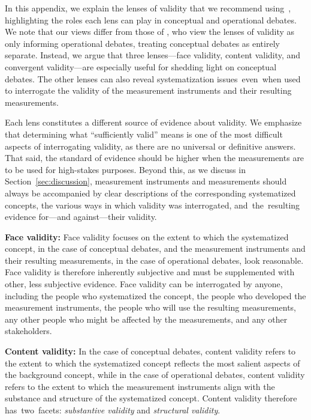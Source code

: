\documentclass{article}
\begin{document}
In this appendix, we explain the lenses of validity that we recommend using~\cite{jacobs2021measurement}, highlighting the roles each lens can play in conceptual and operational debates. We note that our views differ from those of \citet{adcock2001measurement}, who 
view the lenses of validity as only informing operational debates, treating conceptual debates as entirely separate. Instead, we argue that three lenses---face validity, content validity, and convergent validity---are especially useful for shedding light on conceptual debates. The other lenses can also 
reveal systematization issues~even~when used to interrogate the validity of the measurement instruments and their resulting measurements.

Each lens constitutes a different source of evidence about validity. We emphasize that determining what ``sufficiently valid'' means is one of the most difficult aspects of interrogating validity, as there are no universal or definitive answers. That said, the standard of evidence should be higher when the measurements are to be used for high-stakes purposes. Beyond this, as we discuss in Section~\ref{sec:discussion},
measurement instruments and measurements should always be accompanied by clear descriptions of the corresponding systematized concepts, the various ways in which validity was interrogated, and~the~resulting evidence for---and against---their validity.
 
\textbf{Face validity:}  Face validity focuses on the extent to which the systematized concept, in the case of conceptual debates, and the measurement instruments and their resulting measurements, in the case of operational debates, look reasonable. Face validity is therefore inherently subjective and must be supplemented with other, less subjective evidence. Face validity can be interrogated by anyone, including the people who systematized the concept, the people who developed the measurement instruments, the people who will use the resulting measurements, any other people who might be affected by the measurements, and any other stakeholders.

\textbf{Content validity:} In the case of conceptual debates, content validity refers to the extent to which the systematized concept reflects the most salient aspects of the background concept, while in the case of operational debates, content validity refers to the extent to which the measurement instruments align with the substance and structure of the systematized concept. Content validity therefore has~two~facets: \emph{substantive validity} and \emph{structural validity}.
 
\end{document}
